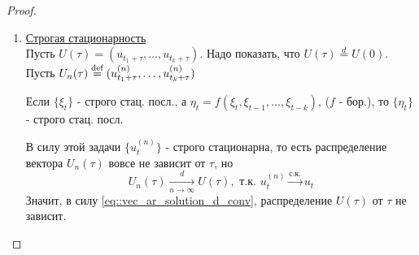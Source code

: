 \begin{proof}
\begin{enumerate}
        \item \underline{Строгая стационарность} \\
        Пусть $U(\tau)=(u_{t_1+\tau},\ldots,u_{t_k+\tau})$. Надо показать, что $U(\tau)\overset{d}{=}U(0)$. \\
        Пусть $U_n(\tau)\stackrel{\text{def}}{=}(u^{(n)}_{t_1+\tau},\ldots,u^{(n)}_{t_k+\tau})$
        \begin{task}
            Если $\{\xi_t\}$ - строго стац. посл., а $\eta_t=f(\xi_t,\xi_{t-1},\ldots,\xi_{t-k})$, ($f$ - бор.),
            то $\{\eta_t\}$ - строго стац. посл.
        \end{task}
        В силу этой задачи $\{u_t^{(n)}\}$ - строго стационарна, то есть распределение вектора $U_n(\tau)$
        вовсе не зависит от $\tau$, но
        \begin{equation}\label{eq::vec_ar_solution_d_conv}
            U_n(\tau)\underset{n\rightarrow\infty}{\xrightarrow{d}}U(\tau),\text{ т.к. } u_t^{(n)}\xrightarrow{\text{с.к.}}u_t
        \end{equation}
        Значит, в силу \eqref{eq::vec_ar_solution_d_conv}, распределение $U(\tau)$ от $\tau$ не зависит.
        

\end{enumerate}
\end{proof}
